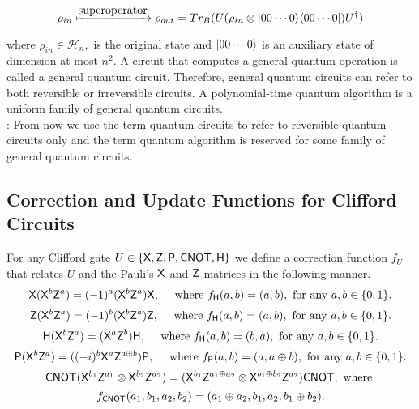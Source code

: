 $$\rho_{in} \xmapsto{\mbox{superoperator}} \rho_{out}=Tr_B(U(\rho_{in} \otimes {\lvert}00\cdots 0\rangle {\langle}00\cdots 0\rvert)U^\dagger)$$

where $\rho_{in} \in \mathcal{H}_n,$ is the original state and ${\lvert}00\cdots 0\rangle$ is an auxiliary state of dimension at most $n^2.$ A circuit that computes a general quantum operation is called a general quantum circuit.  Therefore, general quantum circuits can refer to both reversible or irreversible circuits. A polynomial-time quantum algorithm is a uniform family of general quantum circuits. \\

: From now we use the term  quantum circuits to refer to reversible quantum circuits only and the term quantum algorithm is reserved for some family of general quantum circuits. 


\subsection{Correction and Update Functions for Clifford Circuits}
\label{correction function}
For any Clifford gate $U\in \{{\sf X}, {\sf Z}, {\sf P}, {\sf CNOT},{\sf H}\}$ we define a correction function $f_U$ that relates  $U$ and the Pauli's $ {\sf X}$ and $ {\sf Z}$ matrices in the following manner.
$${\sf X}({\sf X}^b{\sf Z}^a)=(-1)^a({\sf X}^{b}{\sf Z}^{a}) {\sf X},\quad \mbox{ where }f_{\sf H}(a,b)=(a,b), \mbox{ for any } a, b\in\{0,1\}.$$
$${\sf Z}({\sf X}^b{\sf Z}^a)=(-1)^b({\sf X}^{b}{\sf Z}^{a}) {\sf Z},\quad \mbox{ where }f_{\sf H}(a,b)=(a,b), \mbox{ for any } a, b\in\{0,1\}.$$
$${\sf H}({\sf X}^b{\sf Z}^a)=({\sf X}^{a}{\sf Z}^{b}) {\sf H},\quad \mbox{ where }f_{\sf H}(a,b)=(b,a), \mbox{ for any } a, b\in\{0,1\}.$$
$$ {\sf P}({\sf X}^b{\sf Z}^a)=((-i)^b{\sf X}^a{\sf Z}^{a\oplus b}) {\sf P}, \quad \mbox{ where }f_ {\sf P}(a,b)=(a,a\oplus b), \mbox{ for any } a, b\in\{0,1\}.$$
$${\sf CNOT} ({\sf X}^{b_1}{\sf Z}^{a_1} \otimes {\sf X}^{b_2}{\sf Z}^{a_2})=({{\sf X}^{b_1} {{\sf Z}^{a_1\oplus a_2}}} \otimes {{\sf X}^{b_1\oplus b_2}}{\sf Z}^{a_2}){\sf CNOT}, \mbox{ where }$$ $$f_{{\sf CNOT}}(a_1,b_1,a_2,b_2)=(a_1\oplus a_2,b_1,a_2, b_1\oplus b_2).$$

